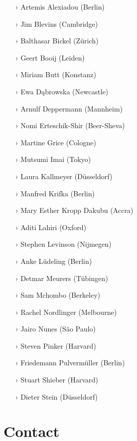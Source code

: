 \documentclass[
notumble,
nofoldmark,
]{leaflet}
\begin{document}
\begin{itemize}
\setlength{\itemsep}{-3pt} 
 \item[›] Artemis Alexiadou (Berlin)
 \item[›] Jim Blevins (Cambridge)
 \item[›] Balthasar Bickel (Z\"urich)
 \item[›] Geert Booij (Leiden)
 \item[›] Miriam Butt (Konstanz)
 \item[›] Ewa D\k{a}browska (Newcastle)
 \item[›] Arnulf Deppermann (Mannheim)
 \item[›] Nomi Erteschik-Shir (Beer-Sheva)
 \item[›] Martine Grice (Cologne)
 \item[›] Mutsumi Imai (Tokyo)
 \item[›] Laura Kallmeyer (D\"usseldorf)
 \item[›] Manfred Krifka (Berlin)
 \item[›] Mary Esther Kropp Dakubu (Accra)
 \item[›] Aditi Lahiri (Oxford)
 \item[›] Stephen Levinson (Nijmegen)
 \item[›] Anke L\"udeling (Berlin)
 \item[›] Detmar Meurers (T\"ubingen)
 \item[›] Sam Mchombo (Berkeley)
 \item[›] Rachel Nordlinger (Melbourne)
 \item[›] Jairo Nunes (S\~ao Paulo)
 \item[›] Steven Pinker (Harvard)
 \item[›] Friedemann Pulverm\"uller (Berlin)
 \item[›] Stuart Shieber (Harvard)
 \item[›] Dieter Stein (D\"usseldorf)  
\end{itemize}

\section{\sffamily\Large\bfseries Contact}  
\end{document}
